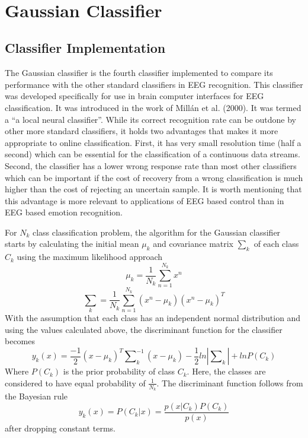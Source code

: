 \documentclass[12pt, a4paper, fleqn]{memoir}%
\begin{document}
\\

\section{Gaussian Classifier}
\label{sec:GaussianClassifier}

\subsection{Classifier Implementation}
The Gaussian classifier is the fourth classifier implemented to compare its performance with the other standard classifiers in EEG recognition. This classifier was developed specifically for use in brain computer interfaces for EEG classification. It was introduced in the work of Mill\'{a}n et al. (2000)\cite{millan2000local}. It was termed a ``a local neural classifier''. While its correct recognition rate can be outdone by other more standard classifiers, it holds two advantages that makes it more appropriate to online classification. First, it has very small resolution time (half a second) which can be essential for the classification of a continuous data streams. Second, the classifier has a lower wrong response rate than most other classifiers which can be important if the cost of recovery from a wrong classification is much higher than the cost of rejecting an uncertain sample. It is worth mentioning that this advantage is more relevant to applications of EEG based control than in EEG based emotion recognition.

For $N_k$ class classification problem, the algorithm for the Gaussian classifier starts by calculating the initial mean $\mu_k$ and covariance matrix $\sum_k$ of each class $C_k$ using the maximum likelihood approach
\begin{equation} \label{eq:mean}
	\mu_k = \frac{1}{N_k}\sum_{n=1}^{N_k}x^n
\end{equation}
\begin{equation} \label{eq:cov}
	\sum_k = \frac{1}{N_k}\sum_{n=1}^{N_k}(x^n - \mu_k)(x^n - \mu_k)^T
\end{equation}
With the assumption that each class has an independent normal distribution and using the values calculated above, the discriminant function for the classifier becomes
\begin{equation} \label{eq:yk}
	y_k(x) = \frac{-1}{2}(x - \mu_k)^T\sum\nolimits_k^{-1}(x-\mu_k)-\frac{1}{2}ln|\sum\nolimits_k|+lnP(C_k)
\end{equation}
Where $P(C_k)$ is the prior probability of class $C_k$. Here, the classes are considered to have equal probability of $\frac{1}{N_k}$. The discriminant function follows from the Bayesian rule
$$y_k(x) = P(C_k|x) = \frac{p(x|C_k)P(C_k)}{p(x)}$$
after dropping constant terms.
\end{document}
